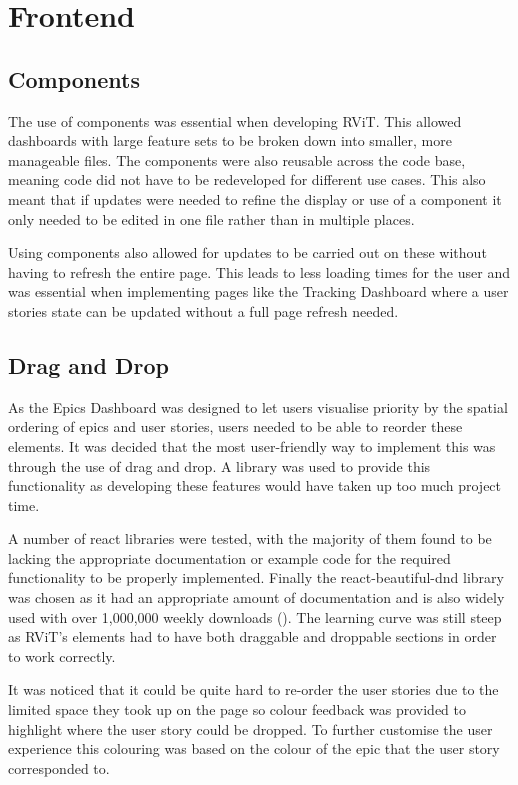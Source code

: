 \documentclass[l4proj.tex]{subfiles}
\begin{document}
\section{Frontend}

\subsection{Components}
The use of components was essential when developing RViT. This allowed dashboards with large feature sets to be broken down into smaller, more manageable files. The components were also reusable across the code base, meaning code did not have to be redeveloped for different use cases. This also meant that if updates were needed to refine the display or use of a component it only needed to be edited in one file rather than in multiple places. 

Using components also allowed for updates to be carried out on these without having to refresh the entire page. This leads to less loading times for the user and was essential when implementing pages like the Tracking Dashboard where a user stories state can be updated without a full page refresh needed. 

\subsection{Drag and Drop}
As the Epics Dashboard was designed to let users visualise priority by the spatial ordering of epics and user stories, users needed to be able to reorder these elements. It was decided that the most user-friendly way to implement this was through the use of drag and drop. A library was used to provide this functionality as developing these features would have taken up too much project time. 

A number of react libraries were tested, with the majority of them found to be lacking the appropriate documentation or example code for the required functionality to be properly implemented. Finally the react-beautiful-dnd library was chosen as it had an appropriate amount of documentation and is also widely used with over 1,000,000 weekly downloads (\cite{ReactDnD}). The learning curve was still steep as RViT's elements had to have both draggable and droppable sections in order to work correctly. 

It was noticed that it could be quite hard to re-order the user stories due to the limited space they took up on the page so colour feedback was provided to highlight where the user story could be dropped. To further customise the user experience this colouring was based on the colour of the epic that the user story corresponded to. 
\end{document}
